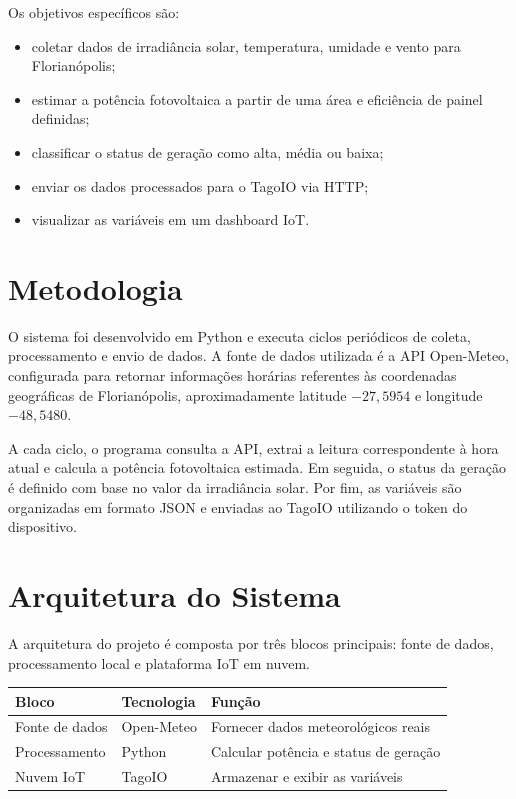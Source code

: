 \documentclass[12pt,a4paper]{article}
\begin{document}
Os objetivos específicos são:

\begin{itemize}
    \item coletar dados de irradiância solar, temperatura, umidade e vento para Florianópolis;
    \item estimar a potência fotovoltaica a partir de uma área e eficiência de painel definidas;
    \item classificar o status de geração como alta, média ou baixa;
    \item enviar os dados processados para o TagoIO via HTTP;
    \item visualizar as variáveis em um dashboard IoT.
\end{itemize}

\section{Metodologia}

O sistema foi desenvolvido em Python e executa ciclos periódicos de coleta, processamento e envio de dados. A fonte de dados utilizada é a API Open-Meteo, configurada para retornar informações horárias referentes às coordenadas geográficas de Florianópolis, aproximadamente latitude $-27{,}5954$ e longitude $-48{,}5480$.

A cada ciclo, o programa consulta a API, extrai a leitura correspondente à hora atual e calcula a potência fotovoltaica estimada. Em seguida, o status da geração é definido com base no valor da irradiância solar. Por fim, as variáveis são organizadas em formato JSON e enviadas ao TagoIO utilizando o token do dispositivo.

\section{Arquitetura do Sistema}

A arquitetura do projeto é composta por três blocos principais: fonte de dados, processamento local e plataforma IoT em nuvem.

\begin{center}
\begin{tabular}{lll}
\toprule
\textbf{Bloco} & \textbf{Tecnologia} & \textbf{Função} \\
\midrule
Fonte de dados & Open-Meteo & Fornecer dados meteorológicos reais \\
Processamento & Python & Calcular potência e status de geração \\
Nuvem IoT & TagoIO & Armazenar e exibir as variáveis \\
\bottomrule
\end{tabular}
\end{center}
\end{document}

